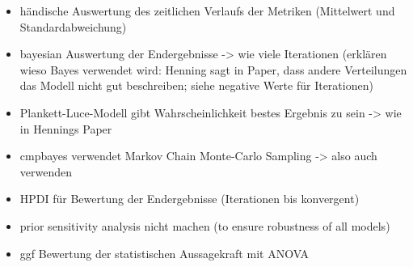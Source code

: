 \begin{itemize}
\begin{itemize}
        \item händische Auswertung des zeitlichen Verlaufs der Metriken (Mittelwert und Standardabweichung)
        \item bayesian Auswertung der Endergebnisse -> wie viele Iterationen (erklären wieso Bayes verwendet wird: Henning sagt in Paper, dass andere Verteilungen das Modell nicht gut beschreiben; siehe negative Werte für Iterationen)
        \item Plankett-Luce-Modell gibt Wahrscheinlichkeit bestes Ergebnis zu sein -> wie in Hennings Paper
        \item cmpbayes verwendet Markov Chain Monte-Carlo Sampling -> also auch verwenden
        \item HPDI für Bewertung der Endergebnisse (Iterationen bis konvergent)
        \item prior sensitivity analysis nicht machen (to ensure robustness of all models)
        \item ggf Bewertung der statistischen Aussagekraft mit ANOVA
    \end{itemize}
\end{itemize}

